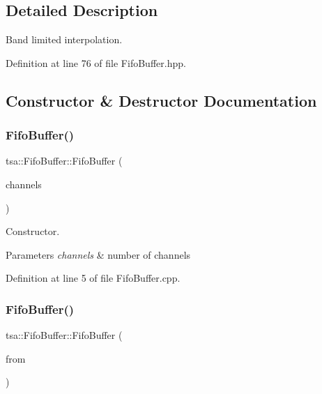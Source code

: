 \subsection{Detailed Description}
Band limited interpolation. 

Definition at line 76 of file Fifo\+Buffer.\+hpp.



\subsection{Constructor \& Destructor Documentation}
\mbox{\label{classtsa_1_1_fifo_buffer_ad30fe947e5c2b34614859cbf12d749f1}} 
\subsubsection{\texorpdfstring{Fifo\+Buffer()}{FifoBuffer()}\hspace{0.1cm}{\footnotesize\ttfamily [1/2]}}
{\footnotesize\ttfamily tsa\+::\+Fifo\+Buffer\+::\+Fifo\+Buffer (\begin{DoxyParamCaption}\item[{unsigned int}]{channels }\end{DoxyParamCaption})}

Constructor.


\begin{DoxyParams}{Parameters}
{\em channels} & number of channels \\
\hline
\end{DoxyParams}


Definition at line 5 of file Fifo\+Buffer.\+cpp.

\mbox{\label{classtsa_1_1_fifo_buffer_ac6a76ca0fd208c80de6e4e04d5c43173}} 
\subsubsection{\texorpdfstring{Fifo\+Buffer()}{FifoBuffer()}\hspace{0.1cm}{\footnotesize\ttfamily [2/2]}}
{\footnotesize\ttfamily tsa\+::\+Fifo\+Buffer\+::\+Fifo\+Buffer (\begin{DoxyParamCaption}\item[{const \hyperlink{classtsa_1_1_fifo_buffer}{Fifo\+Buffer} \&}]{from }\end{DoxyParamCaption})}

